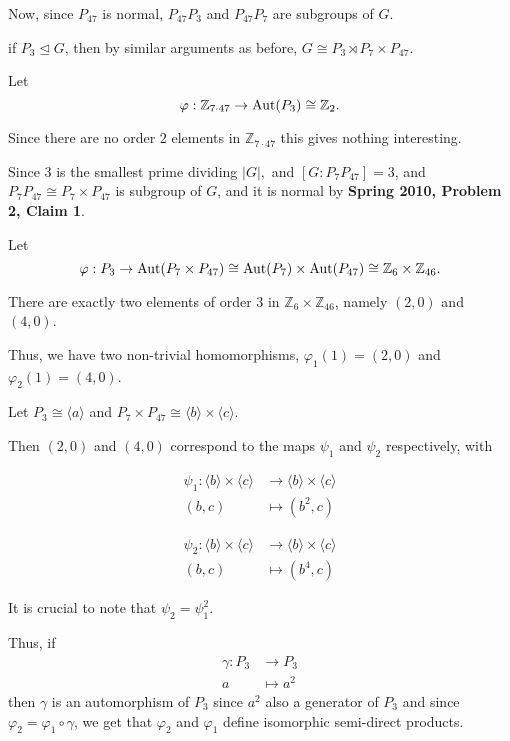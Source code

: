 \documentclass[12pt]{Qual}
\begin{document}
\begin{solution}
Now, since $P_{47}$ is normal, $P_{47}P_3$ and $P_{47}P_7$ are subgroups of $G$.

 if $P_3\trianglelefteq G$, then by similar arguments as before, $G\cong P_3\rtimes P_7\times P_{47}$.

Let $$\varphi:\mathbb{Z}_{7\cdot 47}\to\text{Aut}(P_3)\cong\mathbb{Z}_2.$$

Since there are no order $2$ elements in $\mathbb{Z}_{7\cdot 47}$ this gives nothing interesting.

 Since $3$ is the smallest prime dividing $|G|,$ and $[G:P_7P_{47}]=3$, and $P_7P_{47}\cong P_7\times P_{47}$ is subgroup of $G$, and it is normal by \textbf{Spring 2010, Problem 2, Claim 1}.

Let $$\varphi:P_3\to \text{Aut}(P_7\times P_{47})\cong \text{Aut}(P_7)\times\text{Aut}(P_{47})\cong\mathbb{Z}_6\times\mathbb{Z}_{46}.$$

There are exactly two elements of order $3$ in $\mathbb{Z}_6\times\mathbb{Z}_{46}$, namely $(2,0)$ and $(4,0)$.

Thus, we have two non-trivial homomorphisms, $\varphi_1(1)=(2,0)$ and $\varphi_2(1)=(4,0)$.

Let $P_3\cong\langle a\rangle$ and $P_7\times P_{47}\cong \langle b\rangle\times\langle c\rangle$.

Then $(2,0)$ and $(4,0)$ correspond to the maps $\psi_1$ and $\psi_2$ respectively, with
\begin{center}
\begin{minipage}{0.4\textwidth}
\begin{align*}
    \psi_1: \langle b\rangle\times\langle c\rangle&\to \langle b\rangle\times\langle c\rangle\\
    (b,c)&\mapsto (b^2,c)
\end{align*}
\end{minipage}
\begin{minipage}{0.4\textwidth}
\begin{align*}
    \psi_2: \langle b\rangle\times\langle c\rangle&\to \langle b\rangle\times\langle c\rangle\\
    (b,c)&\mapsto (b^4,c)
\end{align*}
\end{minipage}
\end{center}

It is crucial to note that $\psi_2=\psi_1^2$.

Thus, if \begin{align*}
    \gamma:P_3&\to P_3\\
    a&\mapsto a^2
\end{align*} then $\gamma$ is an automorphism of $P_3$ since $a^2$ also a generator of $P_3$ and since $\varphi_2=\varphi_1\circ\gamma$, we get that $\varphi_2$ and $\varphi_1$ define isomorphic semi-direct products.


\end{solution}
\end{document}
